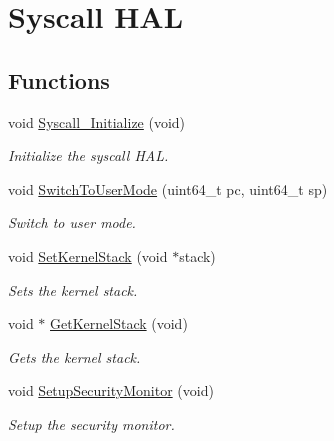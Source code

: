 \hypertarget{group__syscall__hal}{}\section{Syscall H\+AL}
\label{group__syscall__hal}
\subsection*{Functions}
\begin{DoxyCompactItemize}
\item 
void \hyperlink{group__syscall__hal_gae9f4ad6abf7f3be03af3a9e499a2e4f5}{Syscall\+\_\+\+Initialize} (void)\hypertarget{group__syscall__hal_gae9f4ad6abf7f3be03af3a9e499a2e4f5}{}\label{group__syscall__hal_gae9f4ad6abf7f3be03af3a9e499a2e4f5}

\begin{DoxyCompactList}\small\item\em Initialize the syscall H\+AL. \end{DoxyCompactList}\item 
void \hyperlink{group__syscall__hal_ga8dd6b5a2b1d289f84fd6577deb9168b0}{Switch\+To\+User\+Mode} (uint64\+\_\+t pc, uint64\+\_\+t sp)
\begin{DoxyCompactList}\small\item\em Switch to user mode. \end{DoxyCompactList}\item 
void \hyperlink{group__syscall__hal_ga895922ecc344ec7f1377e30cff527a18}{Set\+Kernel\+Stack} (void $\ast$stack)
\begin{DoxyCompactList}\small\item\em Sets the kernel stack. \end{DoxyCompactList}\item 
void $\ast$ \hyperlink{group__syscall__hal_gab5eb7a22391ee3d3a943d043490ab222}{Get\+Kernel\+Stack} (void)
\begin{DoxyCompactList}\small\item\em Gets the kernel stack. \end{DoxyCompactList}\item 
void \hyperlink{group__syscall__hal_ga5dcf060e3d7d3f277ff3932d23e3b035}{Setup\+Security\+Monitor} (void)\hypertarget{group__syscall__hal_ga5dcf060e3d7d3f277ff3932d23e3b035}{}\label{group__syscall__hal_ga5dcf060e3d7d3f277ff3932d23e3b035}

\begin{DoxyCompactList}\small\item\em Setup the security monitor. \end{DoxyCompactList}\end{DoxyCompactItemize}


